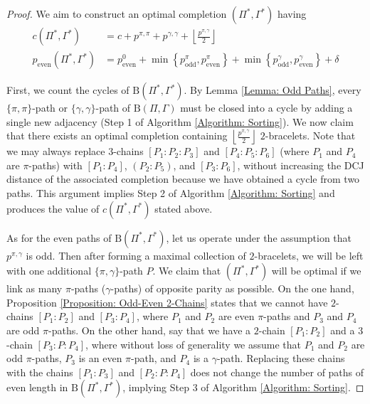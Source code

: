 \begin{proof}

We aim to construct an optimal completion $(\Pi^*, \Gamma^*)$ having
 \begin{align}
 c(\Pi^*, \Gamma^*) &= c + p^{\pi, \pi} + p^{\gamma, \gamma} + \left\lfloor \frac{p^{\pi, \gamma}}{2} \right\rfloor \\
 p_{\mathrm{even}}(\Pi^*, \Gamma^*) &= p^0_{\mathrm{even}} + \min{\left\{p^{\pi}_{\mathrm{odd}}, p^{\pi}_{\mathrm{even}}\right\}} + \min{\left\{p^{\gamma}_{\mathrm{odd}}, p^{\gamma}_{\mathrm{even}}\right\}} + \delta
 \end{align}

\noindent First, we count the cycles of $\mathrm{B}(\Pi^*, \Gamma^*)$.  By Lemma \ref{Lemma: Odd Paths}, every $\{\pi, \pi\}$-path or $\{\gamma, \gamma\}$-path of $\mathrm{B}(\Pi, \Gamma)$ must be closed into a cycle by adding a single new adjacency (Step 1 of Algorithm \ref{Algorithm: Sorting}).  We now claim that there exists an optimal completion containing $\left\lfloor \frac{p^{\pi, \gamma}}{2} \right\rfloor$ $2$-bracelets.  Note that we may always replace $3$-chains $[P_1:P_2:P_3]$ and $[P_4:P_5:P_6]$ (where $P_1$ and $P_4$ are $\pi$-paths) with $[P_1:P_4]$, $(P_2:P_5)$, and $[P_3:P_6]$, without increasing the DCJ distance of the associated completion because we have obtained a cycle from two paths.  This argument implies Step 2 of Algorithm \ref{Algorithm: Sorting} and produces the value of $c(\Pi^*, \Gamma^*)$ stated above.

As for the even paths of $\textrm{B}(\Pi^*, \Gamma^*)$, let us operate under the assumption that $p^{\pi, \gamma}$ is odd.  Then after forming a maximal collection of $2$-bracelets, we will be left with one additional $\{\pi, \gamma\}$-path $P$.  We claim that $(\Pi^*, \Gamma^*)$ will be optimal if we link as many $\pi$-paths ($\gamma$-paths) of opposite parity as possible.  On the one hand, Proposition \ref{Proposition: Odd-Even 2-Chains} states that we cannot have $2$-chains $[P_1:P_2]$ and $[P_3:P_4]$, where $P_1$ and $P_2$ are even $\pi$-paths and $P_3$ and $P_4$ are odd $\pi$-paths.  On the other hand, say that we have a $2$-chain $[P_1:P_2]$ and a $3$-chain $[P_3:P:P_4]$, where without loss of generality we assume that $P_1$ and $P_2$ are odd $\pi$-paths, $P_3$ is an even $\pi$-path, and $P_4$ is a $\gamma$-path.  Replacing these chains with the chains $[P_1:P_3]$ and $[P_2:P:P_4]$ does not change the number of paths of even length in $\mathrm{B}(\Pi^*, \Gamma^*)$, implying Step 3 of Algorithm \ref{Algorithm: Sorting}.


\end{proof}
